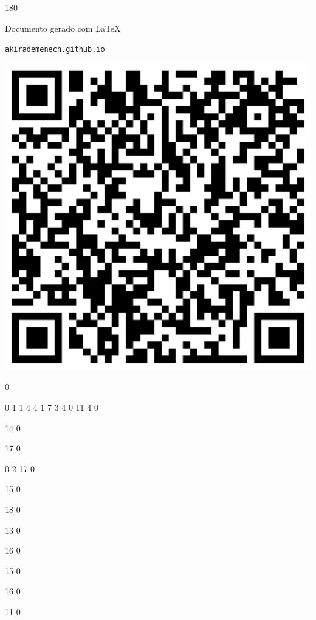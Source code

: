 \documentclass[12pt]{article}
\begin{document}
	\begin{turn}{180}	
		\begin{minipage}{\textwidth}		  
		  Documento gerado com \LaTeX			
		  
		  \texttt{akirademenech.github.io}

		  \includegraphics[height=0.3\textheight]{2e-2.pdf}

		\end{minipage}	
	\end{turn}  
		  
		\vfill  
		  
{
	0	%

	0	%
	1	%
	1	%
	4	%
	4	%
	1	%
	7	%
	3	%
	4	%
	0	%
	11	%
	4	%
	0	%

	14	%
	0	%

	17	%
	0	%

	0	%
	2	%
	17	%
	0	%

	15	%
	0	%

	18	%
	0	%

	13	%
	0	%

	16	%
	0	%

	15	%
	0	%

	16	%
	0	%

	11	%
	0	%

}	  
		    	
\end{document}

